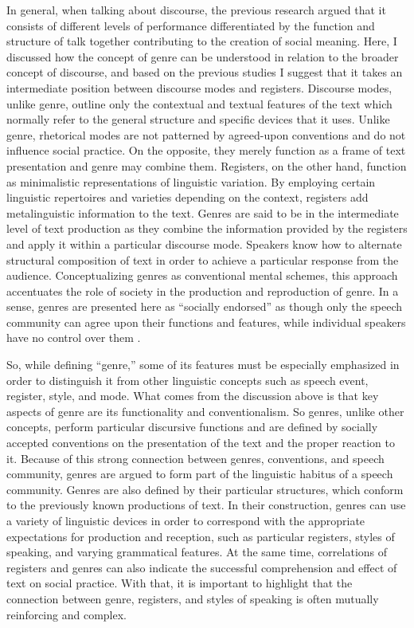 \documentclass[12pt, draft]{article}
\begin{document}
In general, when talking about discourse, the previous research argued that it consists of different levels of performance differentiated by the function and structure of talk together contributing to the creation of social meaning. Here, I discussed how the concept of genre can be understood in relation to the broader concept of discourse, and based on the previous studies I suggest that it takes an intermediate position between discourse modes and registers. Discourse modes, unlike genre, outline only the contextual and textual features of the text which normally refer to the general structure and specific devices that it uses. Unlike genre, rhetorical modes are not patterned by agreed-upon conventions and do not influence social practice. On the opposite, they merely function as a frame of text presentation and genre may combine them. Registers, on the other hand, function as minimalistic representations of linguistic variation. By employing certain linguistic repertoires and varieties depending on the context, registers add metalinguistic information to the text. Genres are said to be in the intermediate level of text production as they combine the information provided by the registers and apply it within a particular discourse mode. Speakers know how to alternate structural composition of text in order to achieve a particular response from the audience. Conceptualizing genres as conventional mental schemes, this approach accentuates the role of society in the production and reproduction of genre. In a sense, genres are presented here as ``socially endorsed'' as though only the speech community can agree upon their functions and features, while individual speakers have no control over them \parencite[p. 60]{bax2011}.  

So, while defining ``genre,'' some of its features must be especially emphasized in order to distinguish it from other linguistic concepts such as speech event, register, style, and mode. What comes from the discussion above is that key aspects of genre are its functionality and conventionalism. So genres, unlike other concepts, perform particular discursive functions and are defined by socially accepted conventions on the presentation of the text and the proper reaction to it. Because of this strong connection between genres, conventions, and speech community, genres are argued to form part of the linguistic habitus of a speech community. Genres are also defined by their particular structures, which conform to the previously known productions of text. In their construction, genres can use a variety of linguistic devices in order to correspond with the appropriate expectations for production and reception, such as particular registers, styles of speaking, and varying grammatical features. At the same time, correlations of registers and genres can also indicate the successful comprehension and effect of text on  social practice. With that, it is important to highlight that the connection between genre, registers, and styles of speaking is often mutually reinforcing and complex. 
\end{document}
